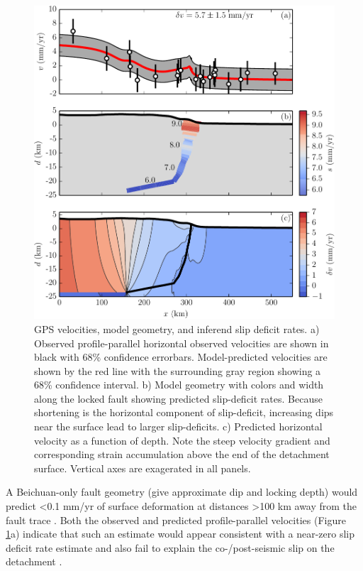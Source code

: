 \documentclass[12pt]{article}
\begin{document}
\begin{figure}[h!]
    \centering
    \includegraphics{figs/stack_figure_all_details.pdf}
    \caption{GPS velocities, model geometry, and inferend slip deficit rates. a) Observed profile-parallel horizontal observed velocities are shown in black with 68\% confidence errorbars. Model-predicted velocities are shown by the red line with the surrounding gray region showing a 68\% confidence interval. b) Model geometry with colors and width along the locked fault showing predicted slip-deficit rates. Because shortening is the horizontal component of slip-deficit, increasing dips near the surface lead to larger slip-deficits. c) Predicted horizontal velocity as a function of depth. Note the steep velocity gradient and corresponding strain accumulation above the end of the detachment surface. Vertical axes are exagerated in all panels.}
    \label{fig:big_stack}
\end{figure}

A Beichuan-only fault geometry (give approximate dip and locking depth) would predict <0.1 mm/yr of surface deformation at distances >100 km away from the fault trace \citep{savage83}. Both the observed and predicted profile-parallel velocities (Figure \ref{fig:big_stack}a) indicate that such an estimate would appear consistent with a near-zero slip deficit rate estimate and also fail to explain the co-/post-seismic slip on the detachment \citet{Qi2011, Fielding2013b}.
\end{document}
